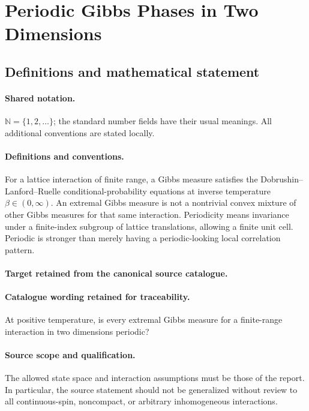 \documentclass[11pt]{article}
\begin{document}
\section{Periodic Gibbs Phases in Two Dimensions}\label{statement}

\subsection{Definitions and mathematical statement}

\paragraph{Shared notation.}$\mathbb N=\{1,2,\ldots\}$; the standard number fields have their usual meanings. All additional conventions are stated locally.


\paragraph{Definitions and conventions.}
For a lattice interaction of finite range, a Gibbs measure satisfies the Dobrushin--Lanford--Ruelle conditional-probability equations at inverse temperature $\beta\in(0,\infty)$. An extremal Gibbs measure is not a nontrivial convex mixture of other Gibbs measures for that same interaction. Periodicity means invariance under a finite-index subgroup of lattice translations, allowing a finite unit cell. Periodic is stronger than merely having a periodic-looking local correlation pattern.

\paragraph{Target retained from the canonical source catalogue.}
\paragraph{Catalogue wording retained for traceability.}
At positive temperature, is every extremal Gibbs measure for a finite-range interaction in two dimensions periodic?

\paragraph{Source scope and qualification.}
The allowed state space and interaction assumptions must be those of the report. In particular, the source statement should not be generalized without review to all continuous-spin, noncompact, or arbitrary inhomogeneous interactions.
\end{document}
